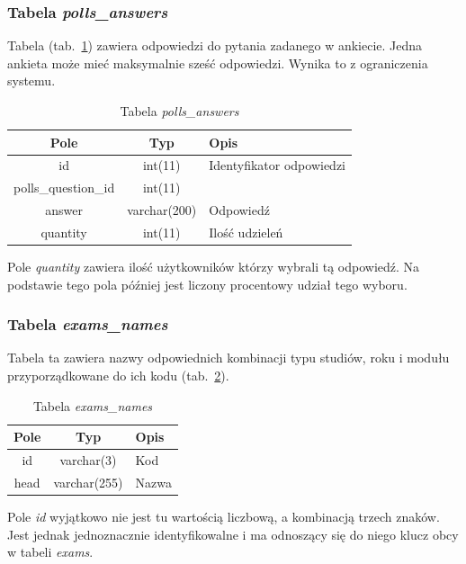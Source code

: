 \documentclass[a4paper,12pt,oneside]{report}
\begin{document}
\subsubsection{Tabela \emph{polls\_answers}}
\label{subsub:polls_answers}
Tabela (tab.~\ref{tab:polls_answers}) zawiera odpowiedzi do pytania zadanego w ankiecie. Jedna ankieta może mieć maksymalnie sześć odpowiedzi. Wynika to z ograniczenia systemu.

\begin{table}[h]
  \centering
  \begin{tabular}{|c|c|l|}\hline
  Pole & Typ & Opis \\\hline
  id          & int(11)      & Identyfikator odpowiedzi \\
  polls\_question\_id & int(11)      & \\
  answer              & varchar(200) & Odpowiedź \\
  quantity            & int(11)      & Ilość udzieleń \\\hline
  \end{tabular}
  \caption{Tabela \emph{polls\_answers}\label{tab:polls_answers}}
\end{table}

Pole \emph{quantity} zawiera ilość użytkowników którzy wybrali tą odpowiedź. Na podstawie tego pola później jest liczony procentowy udział tego wyboru.

\newpage

\subsubsection{Tabela \emph{exams\_names}}
\label{subsub:exams_names}
Tabela ta zawiera nazwy odpowiednich kombinacji typu studiów, roku i modułu przyporządkowane do ich kodu (tab.~\ref{tab:exams_names}).

\begin{table}[h]
  \centering
  \begin{tabular}{|c|c|l|}\hline
  Pole & Typ & Opis \\\hline
  id   & varchar(3)   & Kod \\
  head & varchar(255) & Nazwa \\\hline
  \end{tabular}
  \caption{Tabela \emph{exams\_names}\label{tab:exams_names}}
\end{table}

 Pole \emph{id} wyjątkowo nie jest tu wartością liczbową, a kombinacją trzech znaków. Jest jednak jednoznacznie identyfikowalne i ma odnoszący się do niego klucz obcy w tabeli \emph{exams}.
\end{document}
